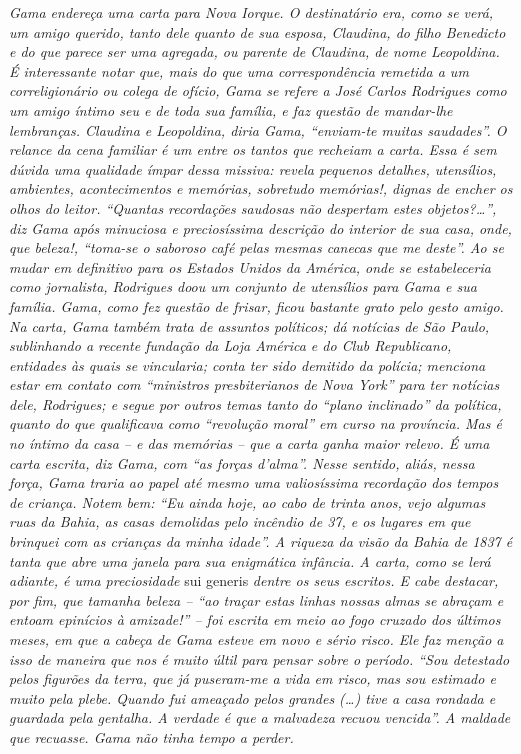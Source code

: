 {\begin{didascalia}
\emph{Gama endereça uma carta para Nova Iorque. O destinatário era, como
se verá, um amigo querido, tanto dele quanto de sua esposa, Claudina, do
filho Benedicto e do que parece ser uma agregada, ou parente de
Claudina, de nome Leopoldina. É interessante notar que, mais do que uma
correspondência remetida a um correligionário ou colega de ofício, Gama
se refere a José Carlos Rodrigues como um amigo íntimo seu e de toda sua
família, e faz questão de mandar-lhe lembranças. Claudina e Leopoldina,
diria Gama, ``enviam-te muitas saudades''. O relance da cena familiar é um
entre os tantos que recheiam a carta. Essa é sem dúvida uma qualidade
ímpar dessa missiva: revela pequenos detalhes, utensílios, ambientes,
acontecimentos e memórias, sobretudo memórias!, dignas de encher os
olhos do leitor. ``Quantas recordações saudosas não despertam estes
objetos?\ldots{}'', diz Gama após minuciosa e preciosíssima descrição do
interior de sua casa, onde, que beleza!, ``toma-se o saboroso café pelas
mesmas canecas que me deste''. Ao se mudar em definitivo para os Estados
Unidos da América, onde se estabeleceria como jornalista, Rodrigues doou
um conjunto de utensílios para Gama e sua família. Gama, como fez
questão de frisar, ficou bastante grato pelo gesto amigo. Na carta, Gama
também trata de assuntos políticos; dá notícias de São Paulo,
sublinhando a recente fundação da Loja América e do Club Republicano,
entidades às quais se vincularia; conta ter sido demitido da polícia;
menciona estar em contato com ``ministros presbiterianos de Nova York''
para ter notícias dele, Rodrigues; e segue por outros temas tanto do
``plano inclinado'' da política, quanto do que qualificava como ``revolução
moral'' em curso na província. Mas é no íntimo da casa -- e das memórias
-- que a carta ganha maior relevo. É uma carta escrita, diz Gama, com
``as forças d'alma''. Nesse sentido, aliás, nessa força, Gama traria ao
papel até mesmo uma valiosíssima recordação dos tempos de criança. Notem
bem: ``Eu ainda hoje, ao cabo de trinta anos, vejo algumas ruas da Bahia,
as casas demolidas pelo incêndio de 37, e os lugares em que brinquei com
as crianças da minha idade''. A riqueza da visão da Bahia de 1837 é tanta
que abre uma janela para sua enigmática infância. A carta, como se lerá
adiante, é uma preciosidade} sui generis \emph{dentre os seus escritos.
E cabe destacar, por fim, que tamanha beleza -- ``ao traçar estas linhas
nossas almas se abraçam e entoam epinícios à amizade!'' -- foi escrita em
meio ao fogo cruzado dos últimos meses, em que a cabeça de Gama esteve
em novo e sério risco. Ele faz menção a isso de maneira que nos é muito
últil para pensar sobre o período. ``Sou detestado pelos figurões da
terra, que já puseram-me a vida em risco, mas sou estimado e muito pela
plebe. Quando fui ameaçado pelos grandes (\ldots{}) tive a casa rondada e
guardada pela gentalha. A verdade é que a malvadeza recuou vencida''. A
maldade que recuasse. Gama não tinha tempo a perder.}
\end{didascalia}



}

